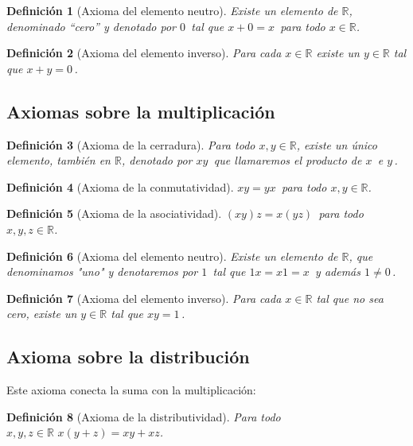\documentclass[oneside,spanish,letterpaper]{extbook}
\theoremstyle{mythmstyle}
\newtheorem{definicion}{Definición}[section]
\begin{document}
\begin{definicion}[Axioma del elemento neutro]Existe un elemento de $\mathbb{R}$, denominado ``cero'' y denotado por $\mathrm{0}\,\!$ tal que $\mathit{x}+0=\mathit{x}\,\!$ para todo $x\in \mathbb{R}$.
\end{definicion}

\begin{definicion}[Axioma del elemento inverso]
Para cada $x\in \mathbb{R}$ existe un $y\in \mathbb{R}$ tal que $\mathit{x}+\mathit{y}=0\,\!$.

\end{definicion}

\subsection {Axiomas sobre la multiplicación}
\begin{definicion}[Axioma de la cerradura]
Para todo $x,y\in \mathbb{R}$, existe un único elemento, también en $\mathbb{R}$, denotado por $xy\,\!$ que llamaremos el producto de $x\,\!$ e $y\,\!$.
\end{definicion}

\begin{definicion}[Axioma de la conmutatividad]
$xy = yx \,\!$ para todo $x,y\in \mathbb{R}$.
\end{definicion}

\begin{definicion}[Axioma de la asociatividad]
$(xy)z = x(yz) \,\!$ para todo $x,y,z\in \mathbb{R}$.
\end{definicion}

\begin{definicion}[Axioma  del elemento neutro]
Existe un elemento de $\mathbb{R}$, que denominamos "uno" y denotaremos por $1 \,\!$ tal que $1x=x1=x \,\!$ y además $1\ne0 \,\!$.
\end{definicion}

\begin{definicion}[Axioma del elemento inverso]
Para cada $x\in \mathbb{R}$ tal que no sea cero, existe un $y\in \mathbb{R}$ tal que $xy=1\,\!$.
\end{definicion}

\subsection{Axioma sobre la distribución}
Este axioma conecta la suma  con la multiplicación:
\begin{definicion}[Axioma de la distributividad]
Para todo $x,y,z\in \mathbb{R}\,\,x(y+z)=xy+xz$.
\end{definicion}
\end{document}
